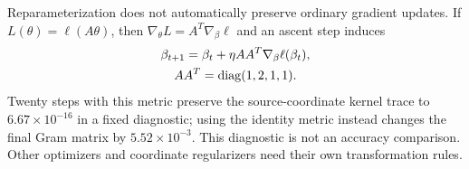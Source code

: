Reparameterization does not automatically preserve ordinary gradient
updates. If $L(\theta)=\ell(A\theta)$, then
$\nabla_\theta L=A^T\nabla_\beta\ell$ and an ascent step induces
\begin{equation}
 \begin{gathered}
 \beta_{t+1}=\beta_t+\eta AA^T\nabla_\beta\ell(\beta_t),\\
 AA^T=\operatorname{diag}(1,2,1,1).
 \end{gathered}
 \label{eq:pushforward}
\end{equation}
Twenty steps with this metric preserve the source-coordinate kernel
trace to $6.67\times10^{-16}$ in a fixed diagnostic; using the identity
metric instead changes the final Gram matrix by $5.52\times10^{-3}$.
This diagnostic is not an accuracy comparison. Other optimizers and
coordinate regularizers need their own transformation rules.
